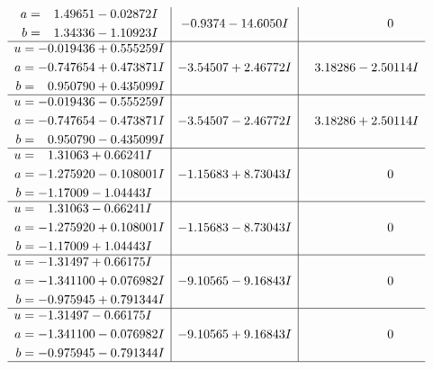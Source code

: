 \documentclass[1p]{elsarticle_modified}
\theoremstyle{definition}
\begin{document}
$$\begin{array}{c|c|c}
\begin{aligned}
a &= \phantom{-}1.49651 - 0.02872 I \\
b &= \phantom{-}1.34336 - 1.10923 I\end{aligned}
 & -0.9374 - 14.6050 I & \phantom{-0.000000 } 0 \\ \hline\begin{aligned}
u &= -0.019436 + 0.555259 I \\
a &= -0.747654 + 0.473871 I \\
b &= \phantom{-}0.950790 + 0.435099 I\end{aligned}
 & -3.54507 + 2.46772 I & \phantom{-}3.18286 - 2.50114 I \\ \hline\begin{aligned}
u &= -0.019436 - 0.555259 I \\
a &= -0.747654 - 0.473871 I \\
b &= \phantom{-}0.950790 - 0.435099 I\end{aligned}
 & -3.54507 - 2.46772 I & \phantom{-}3.18286 + 2.50114 I \\ \hline\begin{aligned}
u &= \phantom{-}1.31063 + 0.66241 I \\
a &= -1.275920 - 0.108001 I \\
b &= -1.17009 - 1.04443 I\end{aligned}
 & -1.15683 + 8.73043 I & \phantom{-0.000000 } 0 \\ \hline\begin{aligned}
u &= \phantom{-}1.31063 - 0.66241 I \\
a &= -1.275920 + 0.108001 I \\
b &= -1.17009 + 1.04443 I\end{aligned}
 & -1.15683 - 8.73043 I & \phantom{-0.000000 } 0 \\ \hline\begin{aligned}
u &= -1.31497 + 0.66175 I \\
a &= -1.341100 + 0.076982 I \\
b &= -0.975945 + 0.791344 I\end{aligned}
 & -9.10565 - 9.16843 I & \phantom{-0.000000 } 0 \\ \hline\begin{aligned}
u &= -1.31497 - 0.66175 I \\
a &= -1.341100 - 0.076982 I \\
b &= -0.975945 - 0.791344 I\end{aligned}
 & -9.10565 + 9.16843 I & \phantom{-0.000000 } 0\\
 \hline 
 \end{array}$$\newpage$$\begin{array}{c|c|c}  

\end{array}$$
\end{document}
